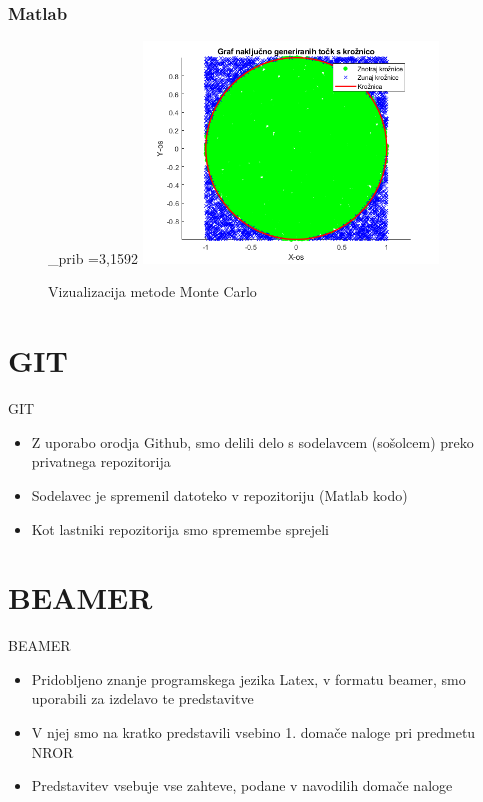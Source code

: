 \documentclass[svgnames]{beamer}
\begin{document}
\begin{frame}
\frametitle{Matlab}
\begin{figure}
\pi_{prib} =3,1592
    \includegraphics[width=0.7\textwidth]{calc_pi_graf.png}
    \caption{\small Vizualizacija metode Monte Carlo}
\end{figure}
\end{frame}

\section{GIT}
\begin{frame}{GIT}
     \begin{itemize}
        \item Z uporabo orodja Github, smo delili delo s sodelavcem (sošolcem) preko privatnega repozitorija
        \pause
        \item Sodelavec je spremenil datoteko v repozitoriju (Matlab kodo)
        \pause
        \item Kot lastniki repozitorija smo spremembe sprejeli
    \end{itemize}
\end{frame}

\section{BEAMER}
\begin{frame}{BEAMER}
    \begin{itemize}
        \item Pridobljeno znanje programskega jezika Latex, v formatu beamer, smo uporabili za izdelavo te predstavitve
        \item V njej smo na kratko predstavili vsebino 1. domače naloge pri predmetu NROR
        \item Predstavitev vsebuje vse zahteve, podane v navodilih domače naloge
    \end{itemize}
\end{frame}
\end{document}
